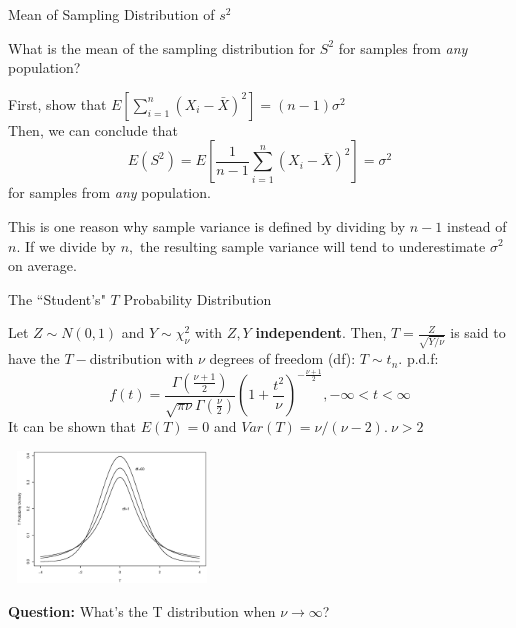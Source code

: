 \documentclass{beamer}\usepackage[]{graphicx}\usepackage[]{color}
\begin{document}
\begin{frame}{Mean of Sampling Distribution of $s^2$}

What is the mean of the sampling distribution for $S^2$ for 
samples from {\em any} population? \pause
\bigskip

First, show that $\displaystyle E \left[\sum_{i=1}^n
(X_i-\bar{X})^2\right] = (n-1)\sigma^2$\\ \pause
\bigskip
Then, we can conclude that 
$$E(S^2) = E\left[\frac{1}{n-1}\sum_{i=1}^n (X_i-\bar{X})^2\right]
= \sigma^2$$
for samples from {\em any} population. \pause
\bigskip

This is one reason why sample variance is defined by dividing by $n-1$
instead of $n.$  If we divide by $n,$ the resulting sample variance will
tend to underestimate $\sigma^2$ on average. \pause

\end{frame}

\begin{frame}{The ``Student's" $T$ Probability Distribution}

Let $Z\sim N(0,1)$ and $Y\sim\chi^2_\nu$ with $Z,Y$ {\bf independent}.
Then, $T=\frac{Z}{\sqrt{Y/\nu}}$
is said to have the $T-$distribution with $\nu$ degrees of freedom (df):
$T\sim t_n.$ \pause
\medskip
p.d.f:
$$f(t) = \frac{\Gamma(\frac{\nu+1}{2})}{\sqrt{\pi \nu} \Gamma(\frac{\nu}{2})} (1+\frac{t^2}{\nu})^{-\frac{\nu+1}{2}}, -\infty < t < \infty$$ \pause
It can be shown that $E(T) = 0$ and $Var(T) = \nu/(\nu-2).\ \nu>2$ \pause

\begin{center}
\vskip-0.6cm
\includegraphics[width=5.5cm,height=3.5cm]{6tdistns}
\vskip-1cm
\end{center}
\vskip -0.6cm
\pause
{\bf Question:} What's the T distribution when $\nu \to \infty$?
\end{frame}
\end{document}
